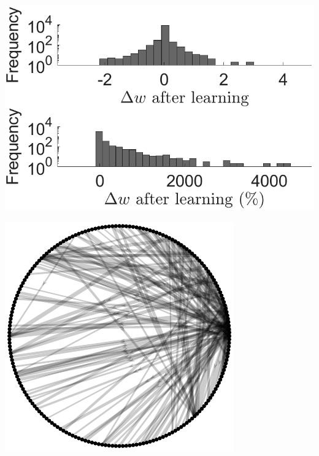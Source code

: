 \documentclass[utf8]{FrontiersinHarvard} %
\begin{document}
\begin{subfigure}
\begin{minipage}[b]{0.21\textwidth}
        \caption{}
        \label{figs:results:network_after_learning}
    \end{minipage}%
\setcounter{figure}{2}
\setcounter{subfigure}{10}
    \centering
    \begin{minipage}[b]{0.32\textwidth}
        \includegraphics[width=\linewidth]{rbSTDP/weights_E2E_change_histogram.pdf}
        \caption{}
        \label{figs:results:network_change}
    \end{minipage}%
\setcounter{figure}{2}
\setcounter{subfigure}{11}
    \centering
    \begin{minipage}[b]{0.21\textwidth}
        \includegraphics[width=\linewidth]{rbSTDP/digraph_end.pdf}

\end{minipage}
\end{subfigure}
\end{document}
